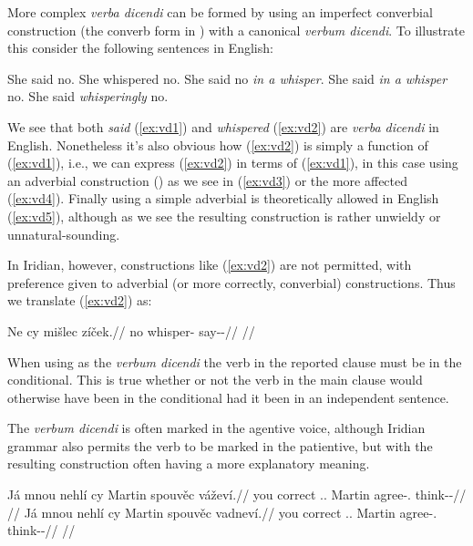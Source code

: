 More complex \emph{verba dicendi} can be formed by using an imperfect converbial
construction (the converb form in ) with a canonical \emph{verbum
dicendi}. To illustrate this consider the following sentences in English:

\pex[*=?*,interpartskip=0pt]
\a\label{ex:vd1} She said no.
\a\label{ex:vd2} She whispered no.
\a\label{ex:vd3} She said no \emph{in a whisper}.
\a\label{ex:vd4}  She said \emph{in a whisper} no.
\a\label{ex:vd5}  She said \emph{whisperingly} no.
\xe

We see that both \emph{said} (\ref{ex:vd1}) and \emph{whispered} (\ref{ex:vd2})
are \emph{verba dicendi} in English. Nonetheless it's also obvious how
(\ref{ex:vd2}) is simply a function of (\ref{ex:vd1}), i.e., we can express
(\ref{ex:vd2}) in terms of (\ref{ex:vd1}), in this case using an adverbial
construction () as we see in (\ref{ex:vd3}) or the more
affected (\ref{ex:vd4}). Finally using a simple adverbial is theoretically allowed
in English (\ref{ex:vd5}), although as we see the resulting construction is
rather unwieldy or unnatural-sounding.

In Iridian, however, constructions like (\ref{ex:vd2}) are not permitted, with
preference given to adverbial (or more correctly, converbial)
constructions. Thus we translate (\ref{ex:vd2}) as:

\pex
\begingl
\gla Ne cy mišlec zíček.//
\glb no  whisper-\Cv{} say-\Av{}-\Pf{}//
\glft {}//
\endgl
\xe

When using  as the \emph{verbum dicendi} the verb in the
reported clause must be in the conditional. This is true whether or not the verb
in the main clause would otherwise have been in the conditional had it been in
an independent sentence.


The \emph{verbum dicendi} is often marked in the agentive voice, although
Iridian grammar also permits the verb to be marked in the patientive, but with
the resulting construction often having a more explanatory meaning.

\pex
\a
\begingl
  \gla Já mnou nehlí cy Martin spouvěc váževí.//
  \glb you correct \Cop{}.\Sbj{}.\Quot{} \Qp{} Martin agree-\Cv{}.\Ipf{} think-\Av{}-\Cont{}//
  \glft {}//
\endgl
\a
\begingl
  \gla Já mnou nehlí cy Martin spouvěc vadneví.//
  \glb you correct \Cop{}.\Sbj{}.\Quot{} \Qp{} Martin agree-\Cv{}.\Ipf{} think-\Pv{}-\Cont{}//
  \glft {}//
\endgl
\xe

